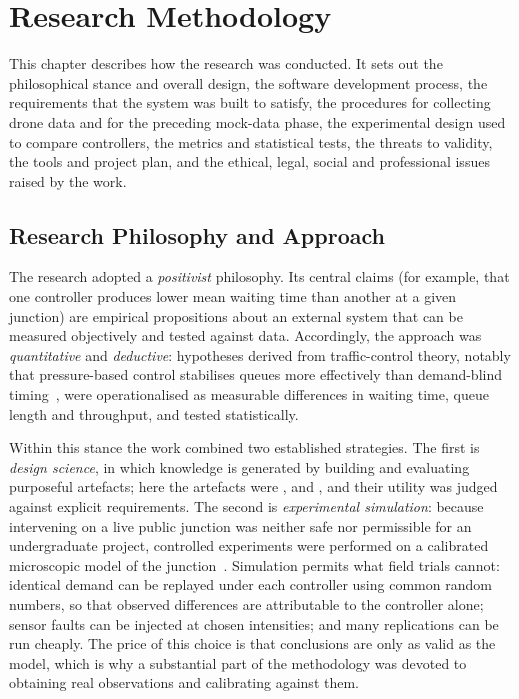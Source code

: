 \chapter{Research Methodology}\label{ch:method}

This chapter describes how the research was conducted. It sets out the philosophical stance and overall design, the software development process, the requirements that the system was built to satisfy, the procedures for collecting drone data and for the preceding mock-data phase, the experimental design used to compare controllers, the metrics and statistical tests, the threats to validity, the tools and project plan, and the ethical, legal, social and professional issues raised by the work.

\section{Research Philosophy and Approach}\label{sec:method-philosophy}

The research adopted a \emph{positivist} philosophy. Its central claims (for example, that one controller produces lower mean waiting time than another at a given junction) are empirical propositions about an external system that can be measured objectively and tested against data. Accordingly, the approach was \emph{quantitative} and \emph{deductive}: hypotheses derived from traffic-control theory, notably that pressure-based control stabilises queues more effectively than demand-blind timing~\cite{varaiya2013maxpressure}, were operationalised as measurable differences in waiting time, queue length and throughput, and tested statistically.

Within this stance the work combined two established strategies. The first is \emph{design science}, in which knowledge is generated by building and evaluating purposeful artefacts; here the artefacts were \dtx{}, \vls{} and \prism{}, and their utility was judged against explicit requirements. The second is \emph{experimental simulation}: because intervening on a live public junction was neither safe nor permissible for an undergraduate project, controlled experiments were performed on a calibrated microscopic model of the junction~\cite{dowling2004toolbox}. Simulation permits what field trials cannot: identical demand can be replayed under each controller using common random numbers, so that observed differences are attributable to the controller alone; sensor faults can be injected at chosen intensities; and many replications can be run cheaply. The price of this choice is that conclusions are only as valid as the model, which is why a substantial part of the methodology was devoted to obtaining real observations and calibrating against them.

